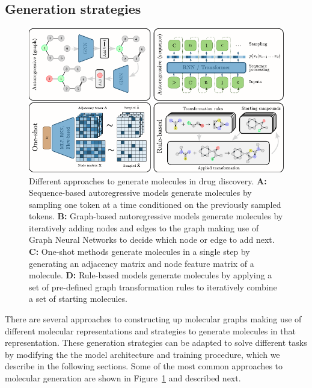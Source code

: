 \subsection{Generation strategies}
\begin{figure}
      \centering
      \includegraphics[width=\textwidth]{figures/generation_strategies_tryout.pdf}
      \caption{Different approaches to generate molecules in drug discovery. \textbf{A:}
            Sequence-based autoregressive models generate molecules by sampling one token at a time
            conditioned on the previously sampled tokens. \textbf{B:} Graph-based autoregressive models
            generate molecules by iteratively adding nodes and edges to the graph making use of Graph
            Neural Networks to decide which node or edge to add next. \textbf{C:} One-shot methods
            generate molecules in a single step by generating an adjacency matrix and node feature matrix
            of a molecule. \textbf{D:} Rule-based models generate molecules by applying a set of
            pre-defined graph transformation rules to iteratively combine a set of starting molecules.
            \label{fig:generation-strategies}}
\end{figure}
There are several approaches to constructing up molecular graphs making use of different molecular
representations and strategies to generate molecules in that representation. These generation
strategies can be adapted to solve different tasks by modifying the the model architecture and
training procedure, which we describe in the following sections. Some of the most common approaches
to molecular generation  are shown in Figure~\ref{fig:generation-strategies} and described next.


